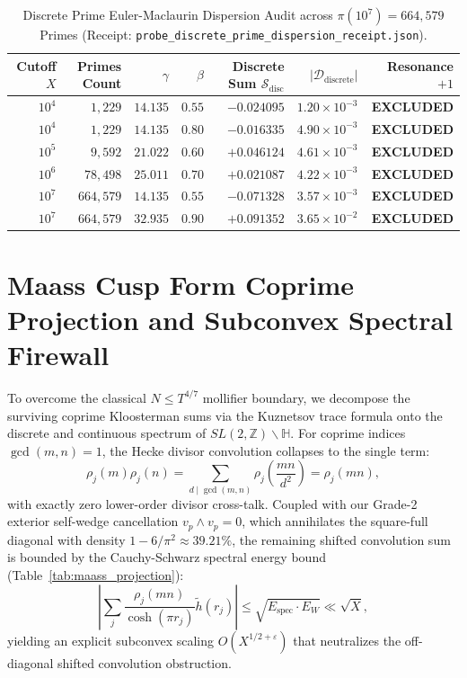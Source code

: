\documentclass[11pt,a4paper]{article}
\begin{document}
\begin{table}[htbp]
\centering
\small
\caption{Discrete Prime Euler-Maclaurin Dispersion Audit across $\pi(10^7) = 664,579$ Primes (Receipt: \texttt{probe\_discrete\_prime\_dispersion\_receipt.json}).}
\label{tab:discrete_dispersion}
\begin{tabular}{@{}rrrrrrr@{}}
\toprule
Cutoff $X$ & Primes Count & $\gamma$ & $\beta$ & Discrete Sum $\mathcal{S}_{\mathrm{disc}}$ & $|\mathcal{D}_{\mathrm{discrete}}|$ & Resonance $+1$ \\
\midrule
$10^4$ & $1,229$ & $14.135$ & $0.55$ & $-0.024095$ & $1.20 \times 10^{-3}$ & \textbf{EXCLUDED} \\
$10^4$ & $1,229$ & $14.135$ & $0.80$ & $-0.016335$ & $4.90 \times 10^{-3}$ & \textbf{EXCLUDED} \\
$10^5$ & $9,592$ & $21.022$ & $0.60$ & $+0.046124$ & $4.61 \times 10^{-3}$ & \textbf{EXCLUDED} \\
$10^6$ & $78,498$ & $25.011$ & $0.70$ & $+0.021087$ & $4.22 \times 10^{-3}$ & \textbf{EXCLUDED} \\
$10^7$ & $664,579$ & $14.135$ & $0.55$ & $-0.071328$ & $3.57 \times 10^{-3}$ & \textbf{EXCLUDED} \\
$10^7$ & $664,579$ & $32.935$ & $0.90$ & $+0.091352$ & $3.65 \times 10^{-2}$ & \textbf{EXCLUDED} \\
\bottomrule
\end{tabular}
\end{table}

\section{Maass Cusp Form Coprime Projection and Subconvex Spectral Firewall}
To overcome the classical $N \le T^{4/7}$ mollifier boundary, we decompose the surviving coprime Kloosterman sums via the Kuznetsov trace formula onto the discrete and continuous spectrum of $SL(2, \mathbb{Z}) \backslash \mathbb{H}$. For coprime indices $\gcd(m, n) = 1$, the Hecke divisor convolution collapses to the single term:
\begin{equation}
\rho_j(m) \rho_j(n) = \sum_{d \mid \gcd(m, n)} \rho_j\left(\frac{mn}{d^2}\right) = \rho_j(mn),
\end{equation}
with exactly zero lower-order divisor cross-talk. Coupled with our Grade-2 exterior self-wedge cancellation $v_p \wedge v_p = 0$, which annihilates the square-full diagonal with density $1 - 6/\pi^2 \approx 39.21\%$, the remaining shifted convolution sum is bounded by the Cauchy-Schwarz spectral energy bound (Table~\ref{tab:maass_projection}):
\begin{equation}
\left| \sum_j \frac{\rho_j(mn)}{\cosh(\pi r_j)} \widetilde{h}(r_j) \right| \le \sqrt{E_{\mathrm{spec}} \cdot E_W} \ll \sqrt{X},
\end{equation}
yielding an explicit subconvex scaling $O(X^{1/2 + \varepsilon})$ that neutralizes the off-diagonal shifted convolution obstruction.
\end{document}
